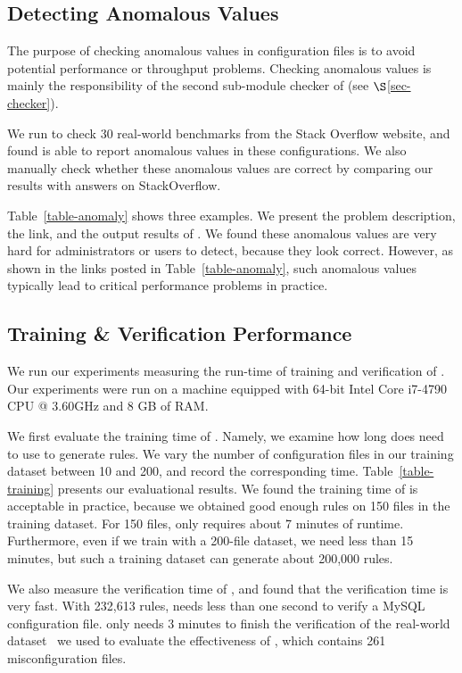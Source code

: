 \subsection{Detecting Anomalous Values}
\label{subsec-anomalous}

The purpose of checking anomalous values in configuration files 
is to avoid potential performance or throughput problems. 
Checking anomalous values is mainly the responsibility of
the second sub-module checker of \app (see $\S$\ref{sec-checker}).

We run \app to check 30 real-world benchmarks from the Stack Overflow 
website, and found \app is able to report anomalous values in
these configurations. We also manually check whether these
anomalous values are correct by comparing our results with
answers on StackOverflow.

Table~\ref{table-anomaly} shows three examples.
We present the problem description, the link, and the output results
of \app. We found these anomalous values are very hard for
administrators or users to detect, because they look correct.
However, as shown in the links posted in Table~\ref{table-anomaly},
such anomalous values typically lead to critical performance
problems in practice.

\subsection{Training \& Verification Performance}
\label{subsec-time}

We run our experiments measuring the run-time of training and
verification of \app.
Our experiments were run on a machine equipped with
64-bit Intel Core i7-4790 CPU @ 3.60GHz and 8 GB of RAM.

We first evaluate the training time of \app. Namely, we examine how long
does \app need to use to generate rules.
We vary the number of configuration files in our training dataset
between 10 and 200, and record the corresponding time.
Table~\ref{table-training} presents our evaluational results.
We found the training time of \app is acceptable in practice,
because we obtained good enough rules on 150 files in the training dataset.
For 150 files, \app only requires about 7 minutes of runtime.
Furthermore, even if we train \app with a 200-file dataset,
we need less than 15 minutes, but such a training dataset
can generate about 200,000 rules.

We also measure the verification time of \app, and found
that the verification time is very fast. With 232,613 rules,
\app needs less than one second to verify a MySQL configuration file.
\app only needs 3 minutes to finish the verification of 
the real-world dataset~\cite{configdataset} we used to 
evaluate the effectiveness of \app,
which contains 261 misconfiguration files. 


